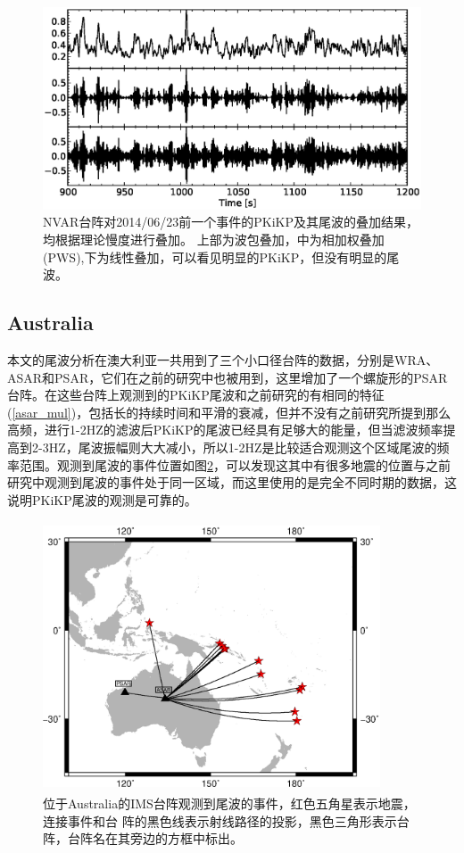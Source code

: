\begin{figure}
	\centering
	\includegraphics[width=12cm,height=6cm]{fig/chap3/nvar_mul2.eps}
	\caption{NVAR台阵对2014/06/23前一个事件的PKiKP及其尾波的叠加结果，均根据理论慢度进行叠加。%
上部为波包叠加，中为相加权叠加(PWS),下为线性叠加，可以看见明显的PKiKP，但没有明显的尾波。}
	\label{nvar_mul2}
\end{figure}

\subsection{Australia}

本文的尾波分析在澳大利亚一共用到了三个小口径台阵的数据，分别是WRA、ASAR和PSAR，它们在之前的研究中也被用到，这里增加了一个螺旋形的PSAR台阵。在这些台阵上观测到的PKiKP尾波和之前研究的有相同的特征(\ref{asar_mul})，包括长的持续时间和平滑的衰减，但并不没有之前研究所提到那么高频，进行1-2HZ的滤波后PKiKP的尾波已经具有足够大的能量，但当滤波频率提高到2-3HZ，尾波振幅则大大减小，所以1-2HZ是比较适合观测这个区域尾波的频率范围。观测到尾波的事件位置如图\ref{au_coda}，可以发现这其中有很多地震的位置与之前研究中观测到尾波的事件处于同一区域，而这里使用的是完全不同时期的数据，这说明PKiKP尾波的观测是可靠的。

\begin{figure}
	\centering
	\includegraphics[width=10cm,height=8cm]{fig/chap3/AU_coda.eps}
	\caption{位于Australia的IMS台阵观测到尾波的事件，红色五角星表示地震，连接事件和台%
阵的黑色线表示射线路径的投影，黑色三角形表示台阵，台阵名在其旁边的方框中标出。}
	\label{au_coda}
\end{figure}

